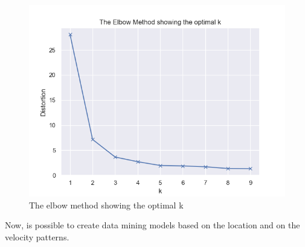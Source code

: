 \begin{figure}[H]
\centering
\includegraphics[width=0.8\linewidth]{Chapters/img/elbow_method_server.png}
\caption{The elbow method showing the optimal k}
\label{fig:elbow_method_server}
\end{figure}
Now, is possible to create data mining models based on the location and on the velocity patterns. 


\newpage
